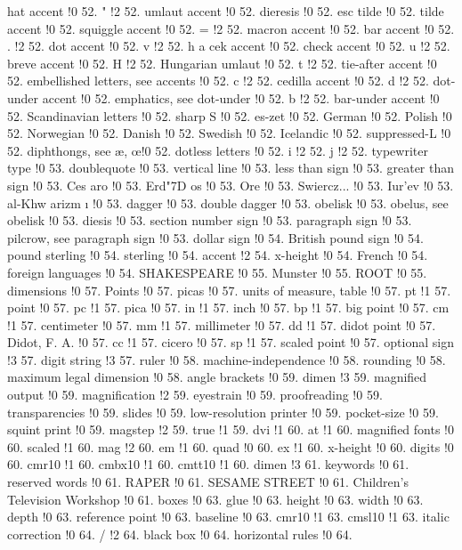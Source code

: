 hat accent !0 52.
" !2 52.
umlaut accent !0 52.
dieresis !0 52.
esc tilde !0 52.
tilde accent !0 52.
squiggle accent !0 52.
= !2 52.
macron accent !0 52.
bar accent !0 52.
. !2 52.
dot accent !0 52.
v !2 52.
h{ a}{ c}ek accent !0 52.
check accent !0 52.
u !2 52.
breve accent !0 52.
H !2 52.
Hungarian umlaut !0 52.
t !2 52.
tie-after accent !0 52.
embellished letters, see accents !0 52.
c !2 52.
cedilla accent !0 52.
d !2 52.
dot-under accent !0 52.
emphatics, see dot-under !0 52.
b !2 52.
bar-under accent !0 52.
Scandinavian letters !0 52.
sharp S !0 52.
es-zet !0 52.
German !0 52.
Polish !0 52.
Norwegian !0 52.
Danish !0 52.
Swedish !0 52.
Icelandic !0 52.
suppressed-L !0 52.
diphthongs, see \ae , \oe  !0 52.
dotless letters !0 52.
i !2 52.
j !2 52.
typewriter type !0 53.
doublequote !0 53.
vertical line !0 53.
less than sign !0 53.
greater than sign !0 53.
Ces{ a}ro !0 53.
Erd{\accent "7D o}s !0 53.
Ore !0 53.
Swiercz... !0 53.
Iur'ev !0 53.
al-Khw{ a}rizm{ \i } !0 53.
dagger !0 53.
double dagger !0 53.
obelisk !0 53.
obelus, see obelisk !0 53.
diesis !0 53.
section number sign !0 53.
paragraph sign !0 53.
pilcrow, see paragraph sign !0 53.
dollar sign !0 54.
British pound sign !0 54.
pound sterling !0 54.
sterling !0 54.
accent !2 54.
x-height !0 54.
French !0 54.
foreign languages !0 54.
SHAKESPEARE !0 55.
Munster !0 55.
ROOT !0 55.
dimensions !0 57.
Points !0 57.
picas !0 57.
units of measure, table !0 57.
pt !1 57.
point !0 57.
pc !1 57.
pica !0 57.
in !1 57.
inch !0 57.
bp !1 57.
big point !0 57.
cm !1 57.
centimeter !0 57.
mm !1 57.
millimeter !0 57.
dd !1 57.
didot point !0 57.
Didot, F. A. !0 57.
cc !1 57.
cicero !0 57.
sp !1 57.
scaled point !0 57.
optional sign !3 57.
digit string !3 57.
ruler !0 58.
machine-independence !0 58.
rounding !0 58.
maximum legal dimension !0 58.
angle brackets !0 59.
dimen !3 59.
magnif{}ied output !0 59.
magnification !2 59.
eyestrain !0 59.
proofreading !0 59.
transparencies !0 59.
slides !0 59.
low-resolution printer !0 59.
pocket-size !0 59.
squint print !0 59.
magstep !2 59.
true !1 59.
dvi !1 60.
at !1 60.
magnified fonts !0 60.
scaled !1 60.
mag !2 60.
em !1 60.
quad !0 60.
ex !1 60.
x-height !0 60.
digits !0 60.
cmr10 !1 60.
cmbx10 !1 60.
cmtt10 !1 60.
dimen !3 61.
keywords !0 61.
reserved words !0 61.
RAPER !0 61.
SESAME STREET !0 61.
Children's Television Workshop !0 61.
boxes !0 63.
glue !0 63.
height !0 63.
width !0 63.
depth !0 63.
reference point !0 63.
baseline !0 63.
cmr10 !1 63.
cmsl10 !1 63.
italic correction !0 64.
/ !2 64.
black box !0 64.
horizontal rules !0 64.
